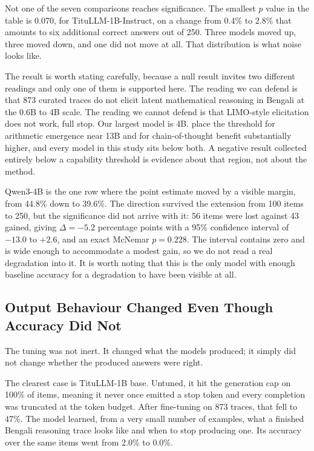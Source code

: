 Not one of the seven comparisons reaches significance. The smallest $p$ value in
the table is 0.070, for TituLLM-1B-Instruct, on a change from 0.4\% to 2.8\%
that amounts to six additional correct answers out of 250. Three models moved
up, three moved down, and one did not move at all. That distribution is what
noise looks like.

The result is worth stating carefully, because a null result invites two
different readings and only one of them is supported here. The reading we can
defend is that 873 curated traces do not elicit latent mathematical reasoning
in Bengali at the 0.6B to 4B scale. The reading we cannot defend is that
LIMO-style elicitation does not work, full stop. Our largest model is 4B.
\textcite{wei2022emergent} place the threshold for arithmetic emergence near
13B and for chain-of-thought benefit substantially higher, and every model in
this study sits below both. A negative result collected entirely below a
capability threshold is evidence about that region, not about the method.

Qwen3-4B is the one row where the point estimate moved by a visible margin, from
44.8\% down to 39.6\%. The direction survived the extension from 100 items to
250, but the significance did not arrive with it: 56 items were lost against 43
gained, giving $\Delta = -5.2$ percentage points with a 95\% confidence interval
of $-13.0$ to $+2.6$, and an exact McNemar $p=0.228$. The interval contains zero
and is wide enough to accommodate a modest gain, so we do not read a real
degradation into it. It is worth noting that this is the only model with
enough baseline accuracy for a degradation to have been visible at all.

\subsection{Output Behaviour Changed Even Though Accuracy Did Not}
\label{sec:behaviour}

The tuning was not inert. It changed what the models produced; it simply did not
change whether the produced answers were right.

The clearest case is TituLLM-1B base. Untuned, it hit the generation cap on
100\% of items, meaning it never once emitted a stop token and every completion
was truncated at the token budget. After fine-tuning on 873 traces, that fell to
47\%. The model learned, from a very small number of examples, what a finished
Bengali reasoning trace looks like and when to stop producing one. Its accuracy
over the same items went from 2.0\% to 0.0\%.

